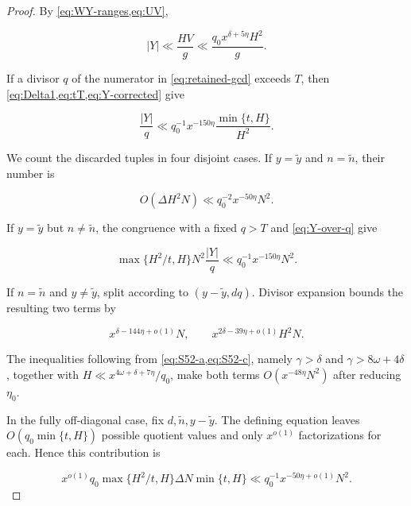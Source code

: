 \begin{proof}
By \cref{eq:WY-ranges,eq:UV},

\begin{equation}\label{eq:Y-corrected}
 |Y|\ll\frac{HV}{g}
 \ll\frac{q_0x^{\delta+5\eta}H^2}{g}.
\end{equation}

If a divisor $q$ of the numerator in \cref{eq:retained-gcd} exceeds $T$,
then \cref{eq:Delta1,eq:tT,eq:Y-corrected} give

\begin{equation}\label{eq:Y-over-q}
 \frac{|Y|}{q}
 \ll q_0^{-1}x^{-150\eta}
 \frac{\min\{t,H\}}{H^2}.
\end{equation}

We count the discarded tuples in four disjoint cases.  If
$y=\widetilde y$ and $n=\widetilde n$, their number is

\begin{equation}\label{eq:diag-1}
 O(\Delta H^2N)
 \ll q_0^{-2}x^{-50\eta}N^2.
\end{equation}

If $y=\widetilde y$ but $n\ne\widetilde n$, the congruence with a fixed
$q>T$ and \cref{eq:Y-over-q} give

\begin{equation}\label{eq:diag-2}
 \max\{H^2/t,H\}N^2\frac{|Y|}{q}
 \ll q_0^{-1}x^{-150\eta}N^2.
\end{equation}

If $n=\widetilde n$ and $y\ne\widetilde y$, split according to
$(y-\widetilde y,dq)$.  Divisor expansion bounds the resulting two terms by

\begin{equation}\label{eq:diag-3}
 x^{\delta-144\eta+o(1)}N,
 \qquad
 x^{2\delta-39\eta+o(1)}H^2N.
\end{equation}

The inequalities following from \cref{eq:S52-a,eq:S52-c}, namely
$\gamma>\delta$ and $\gamma>8\omega+4\delta$, together with
$H\ll x^{4\omega+\delta+7\eta}/q_0$, make both terms
$O(x^{-48\eta}N^2)$ after reducing $\eta_0$.

In the fully off-diagonal case, fix $d,\widetilde n,y-\widetilde y$.  The
defining equation leaves $O(q_0\min\{t,H\})$ possible quotient values and
only $x^{o(1)}$ factorizations for each.  Hence this contribution is

\begin{equation}\label{eq:diag-4}
 x^{o(1)}q_0\max\{H^2/t,H\}\Delta N\min\{t,H\}
 \ll q_0^{-1}x^{-50\eta+o(1)}N^2.
\end{equation}


\end{proof}
